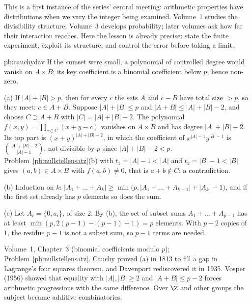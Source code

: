 This is a first instance of the series' central meeting: arithmetic properties
have distributions when we vary the integer being examined. Volume~1 studies
the divisibility structure; Volume~3 develops probability; later volumes ask how
far their interaction reaches. Here the lesson is already precise: state the
finite experiment, exploit its structure, and control the error before taking
a limit.

\begin{solution}{pb:cauchydav}
\idea If the sumset were small, a polynomial of controlled degree would vanish on $A\times B$; its key coefficient is a binomial
coefficient below $p$, hence non-zero.

\writeup (a) If $|A|+|B|>p$, then for every $c$ the sets $A$ and $c-B$ have total size $>p$, so they meet: $c\in A+B$. Suppose
$|A|+|B|\le p$ and $|A+B|\le|A|+|B|-2$, and choose $C\supset A+B$ with $|C|=|A|+|B|-2$. The polynomial
$f(x,y)=\prod_{c\in C}(x+y-c)$ vanishes on $A\times B$ and has degree $|A|+|B|-2$. Its top part is $(x+y)^{|A|+|B|-2}$, in which
the coefficient of $x^{|A|-1}y^{|B|-1}$ is $\binom{|A|+|B|-2}{|A|-1}$, not divisible by $p$ since $|A|+|B|-2<p$. Problem~\ref{pb:nullstellensatz}(b)
with $t_1=|A|-1<|A|$ and $t_2=|B|-1<|B|$ gives $(a,b)\in A\times B$ with $f(a,b)\ne0$, that is $a+b\notin C$: a contradiction.

(b) Induction on $k$: $|A_1+\dots+A_k|\ge\min\bigl(p,|A_1+\dots+A_{k-1}|+|A_k|-1\bigr)$, and if the first set already has $p$
elements so does the sum.

(c) Let $A_i=\{0,a_i\}$, of size $2$. By (b), the set of subset sums $A_1+\dots+A_{p-1}$ has at least
$\min(p,2(p-1)-(p-1)+1)=p$ elements. With $p-2$ copies of $1$, the residue $p-1$ is not a subset sum, so $p-1$ terms are needed.

\tools Volume~1, Chapter~3 (binomial coefficients modulo $p$); Problem~\ref{pb:nullstellensatz}.
\leads Cauchy proved (a) in 1813 to fill a gap in Lagrange's four squares theorem, and Davenport rediscovered it in 1935. Vosper
(1956) showed that equality with $|A|,|B|\ge2$ and $|A+B|\le p-2$ forces arithmetic progressions with the same difference. Over
$\Z$ and other groups the subject became additive combinatorics.
\end{solution}

